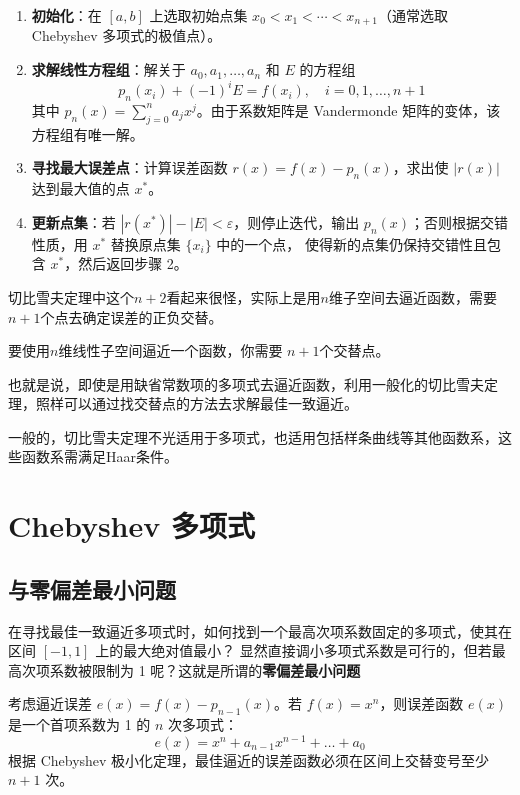 \begin{enumerate}
    \item \textbf{初始化}：在 \([a, b]\) 上选取初始点集 \(x_0 < x_1 < \cdots <
        x_{n+1}\)（通常选取 Chebyshev 多项式的极值点）。
    \item \textbf{求解线性方程组}：解关于 \(a_0, a_1, \dots, a_n\) 和 \(E\) 的方程组
        \[
            p_n(x_i) + (-1)^i E = f(x_i), \quad i = 0, 1, \dots, n+1
        \]
        其中 \(p_n(x) = \sum_{j=0}^n a_j x^j\)。由于系数矩阵是 Vandermonde 矩阵的变体，该方程组有唯一解。
    \item \textbf{寻找最大误差点}：计算误差函数 \(r(x) = f(x) - p_n(x)\)，求出使
        \(|r(x)|\) 达到最大值的点 \(x^*\)。
    \item \textbf{更新点集}：若 \(|r(x^*)| - |E| < \varepsilon\)，则停止迭代，输出
        \(p_n(x)\)；否则根据交错性质，用 \(x^*\) 替换原点集 \(\{x_i\}\) 中的一个点，
        使得新的点集仍保持交错性且包含 \(x^*\)，然后返回步骤 2。
\end{enumerate}
切比雪夫定理中这个\(n+2\)看起来很怪，实际上是用\(n\)维子空间去逼近函数，需要\(n+1\)个点去确定误差的正负交替。
\begin{theorem}
    要使用\(n\)维线性子空间逼近一个函数，你需要 \(n+1\)个交替点。
\end{theorem}
也就是说，即使是用缺省常数项的多项式去逼近函数，利用一般化的切比雪夫定理，照样可以通过找交替点的方法去求解最佳一致逼近。

一般的，切比雪夫定理不光适用于多项式，也适用包括样条曲线等其他函数系，这些函数系需满足Haar条件。
\section{Chebyshev 多项式}

\subsection{与零偏差最小问题}

在寻找最佳一致逼近多项式时，如何找到一个最高次项系数固定的多项式，使其在区间 \([-1, 1]\) 上的最大绝对值最小？
显然直接调小多项式系数是可行的，但若最高次项系数被限制为 1 呢？这就是所谓的\textbf{零偏差最小问题}

考虑逼近误差 \(e(x) = f(x) - p_{n-1}(x)\)。若 \(f(x) = x^n\)，则误差函数 \(e(x)\)
是一个首项系数为 1 的 \(n\) 次多项式：
\[
    e(x) = x^n + a_{n-1}x^{n-1} + \dots + a_0
\]
根据 Chebyshev 极小化定理，最佳逼近的误差函数必须在区间上交替变号至少 \(n+1\) 次。

